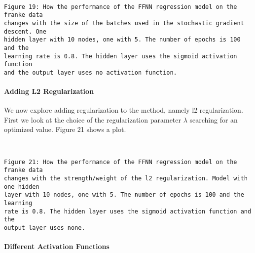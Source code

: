 \documentclass[11pt]{article}
\begin{document}
    \begin{center}
    \end{center}
    { \hspace*{\fill} \\}
    
    \begin{Verbatim}[commandchars=\\\{\}]
Figure 19: How the performance of the FFNN regression model on the franke data
changes with the size of the batches used in the stochastic gradient descent. One 
hidden layer with 10 nodes, one with 5. The number of epochs is 100 and the 
learning rate is 0.8. The hidden layer uses the sigmoid activation function 
and the output layer uses no activation function.
    \end{Verbatim}


    \hypertarget{adding-l2-regularization}{%
\paragraph{Adding L2 Regularization}\label{adding-l2-regularization}}


 We now explore adding regularization to the method, namely l2
regularization. First we look at the choice of the regularization
parameter \(\lambda\) searching for an optimized value. Figure 21 shows
a plot.

    \begin{center}
    \end{center}
    { \hspace*{\fill} \\}
    
    \begin{Verbatim}[commandchars=\\\{\}]
Figure 21: How the performance of the FFNN regression model on the franke data
changes with the strength/weight of the l2 regularization. Model with one hidden 
layer with 10 nodes, one with 5. The number of epochs is 100 and the learning 
rate is 0.8. The hidden layer uses the sigmoid activation function and the
output layer uses none.
    \end{Verbatim}

    \hypertarget{different-activation-functions}{%
\paragraph{Different Activation
Functions}\label{different-activation-functions}}
\end{document}
